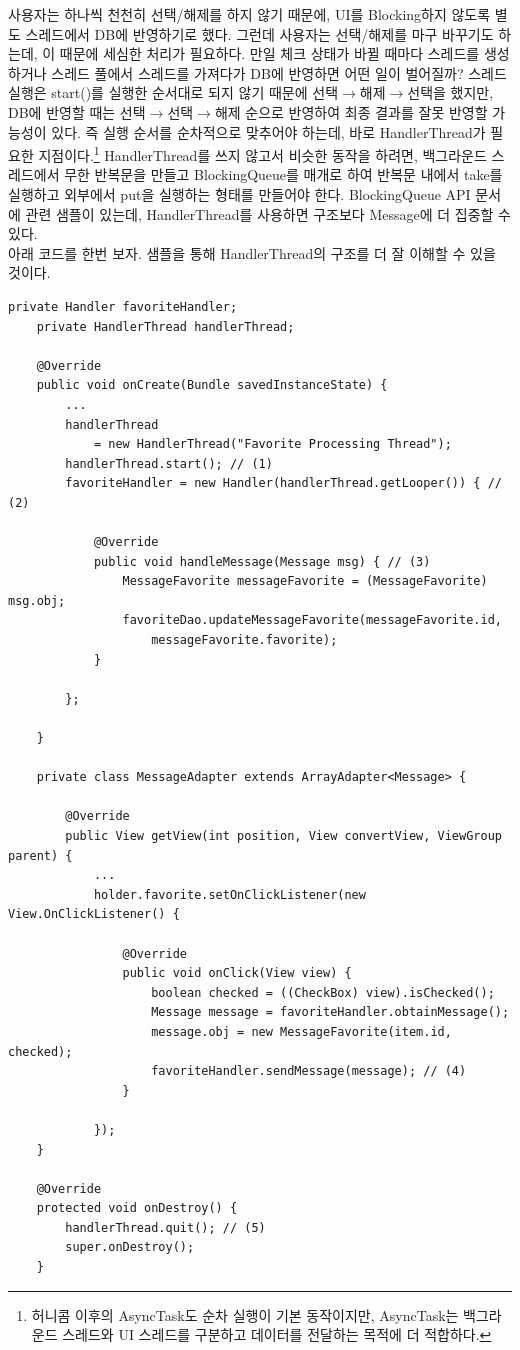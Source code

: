 사용자는 하나씩 천천히 선택/해제를 하지 않기 때문에, UI를 Blocking하지 않도록 별도 스레드에서 DB에 반영하기로 했다.
그런데 사용자는 선택/해제를 마구 바꾸기도 하는데, 이 때문에 세심한 처리가 필요하다.
만일 체크 상태가 바뀔 때마다 스레드를 생성하거나 스레드 풀에서 스레드를 가져다가 DB에 반영하면 어떤 일이 벌어질까? 
스레드 실행은 start()를 실행한 순서대로 되지 않기 때문에 선택$\rightarrow$해제$\rightarrow$선택을 했지만, DB에 반영할 때는 선택$\rightarrow$선택$\rightarrow$해제 순으로 반영하여 최종 결과를 잘못 반영할 가능성이 있다. 
즉 실행 순서를 순차적으로 맞추어야 하는데, 바로 HandlerThread가 필요한 지점이다.\footnote{허니콤 이후의 AsyncTask도 순차 실행이 기본 동작이지만, AsyncTask는 백그라운드 스레드와 UI 스레드를 구분하고 데이터를 전달하는 목적에 더 적합하다.}
HandlerThread를 쓰지 않고서 비슷한 동작을 하려면, 백그라운드 스레드에서 무한 반복문을 만들고 BlockingQueue를 매개로 하여 반복문 내에서 take를 실행하고 외부에서 put을 실행하는 형태를 만들어야 한다.
BlockingQueue API 문서에 관련 샘플이 있는데, HandlerThread를 사용하면 구조보다 Message에 더 집중할 수 있다.\\

아래 코드를 한번 보자. 샘플을 통해 HandlerThread의 구조를 더 잘 이해할 수 있을 것이다.
\begin{lstlisting}[frame=single, label=src:HandlerThreadSample] 
 	private Handler favoriteHandler;
    private HandlerThread handlerThread;

    @Override
    public void onCreate(Bundle savedInstanceState) {
       	... 
       	handlerThread 
       		= new HandlerThread("Favorite Processing Thread");
        handlerThread.start(); // (1)
        favoriteHandler = new Handler(handlerThread.getLooper()) { // (2)

            @Override
            public void handleMessage(Message msg) { // (3)
                MessageFavorite messageFavorite = (MessageFavorite) msg.obj;
                favoriteDao.updateMessageFavorite(messageFavorite.id, 
                	messageFavorite.favorite);
            }

        };
        
	}

	private class MessageAdapter extends ArrayAdapter<Message> {
		
		@Override
        public View getView(int position, View convertView, ViewGroup parent) {	
        	...
			holder.favorite.setOnClickListener(new View.OnClickListener() {

                @Override
                public void onClick(View view) {
                    boolean checked = ((CheckBox) view).isChecked();
                    Message message = favoriteHandler.obtainMessage();
                    message.obj = new MessageFavorite(item.id, checked);
                    favoriteHandler.sendMessage(message); // (4)
                }

            });
	}
	
	@Override
    protected void onDestroy() { 
        handlerThread.quit(); // (5)
        super.onDestroy();
    }
\end{lstlisting}

